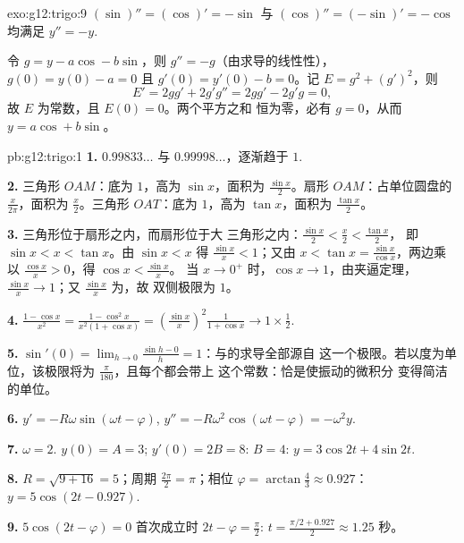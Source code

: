 \begin{solution}{exo:g12:trigo:9}
$(\sin)'' = (\cos)' = -\sin$ 与 $(\cos)'' = (-\sin)' = -\cos$ 均满足
$y'' = -y$.

令 $g = y - a\cos - b\sin$，则 $g'' = -g$（由求导的线性性），
$g(0) = y(0) - a = 0$ 且 $g'(0) = y'(0) - b = 0$。记
$E = g^2 + (g')^2$，则
\[
E' = 2g g' + 2g' g'' = 2g g' - 2g' g = 0,
\]
故 $E$ 为常数，且 $E(0) = 0$。两个平方之和
恒为零，必有 $g = 0$，从而 $y = a\cos + b\sin$。
\end{solution}

\begin{solution}{pb:g12:trigo:1}
\textbf{1.} $0.99833\ldots$ 与 $0.99998\ldots$，逐渐趋于
$1$.

\textbf{2.} 三角形 $OAM$：底为 $1$，高为 $\sin x$，面积为
$\frac{\sin x}{2}$。扇形 $OAM$：占单位圆盘的
$\frac{x}{2\pi}$，面积为 $\frac x2$。三角形
$OAT$：底为 $1$，高为 $\tan x$，面积为 $\frac{\tan x}{2}$。

\textbf{3.} 三角形位于扇形之内，而扇形位于大
三角形之内：$\frac{\sin x}{2} < \frac x2 < \frac{\tan x}{2}$，
即 $\sin x < x < \tan x$。由 $\sin x < x$ 得
$\frac{\sin x}{x} < 1$；又由
$x < \tan x = \frac{\sin x}{\cos x}$，两边乘以
$\frac{\cos x}{x} > 0$，得 $\cos x < \frac{\sin x}{x}$。
当 $x \to 0^+$ 时，$\cos x \to 1$，由夹逼定理，
$\frac{\sin x}{x} \to 1$；又 $\frac{\sin x}{x}$ 为，故
双侧极限为 $1$。

\textbf{4.} $\frac{1 - \cos x}{x^2} =
\frac{1 - \cos^2 x}{x^2 (1 + \cos x)} =
\left(\frac{\sin x}{x}\right)^2 \frac{1}{1 + \cos x}
\to 1 \times \frac12$.

\textbf{5.} $\sin'(0) = \lim_{h \to 0} \frac{\sin h - 0}{h} =
1$：与的求导全部源自
这一个极限。若以度为单位，该极限将为
$\frac{\pi}{180}$，且每个都会带上
这个常数：恰是使振动的微积分
变得简洁的单位。

\textbf{6.} $y' = -R\omega\sin(\omega t - \varphi)$,
$y'' = -R\omega^2\cos(\omega t - \varphi) = -\omega^2 y$.

\textbf{7.} $\omega = 2$. $y(0) = A = 3$;
$y'(0) = 2B = 8$: $B = 4$: $y = 3\cos 2t + 4\sin 2t$.

\textbf{8.} $R = \sqrt{9 + 16} = 5$；周期
$\frac{2\pi}{2} = \pi$；相位
$\varphi = \arctan\frac43 \approx 0.927$：
$y = 5\cos(2t - 0.927)$.

\textbf{9.} $5\cos(2t - \varphi) = 0$ 首次成立时
$2t - \varphi = \frac\pi2$:
$t = \frac{\pi/2 + 0.927}{2} \approx 1.25$ 秒。


\end{solution}
